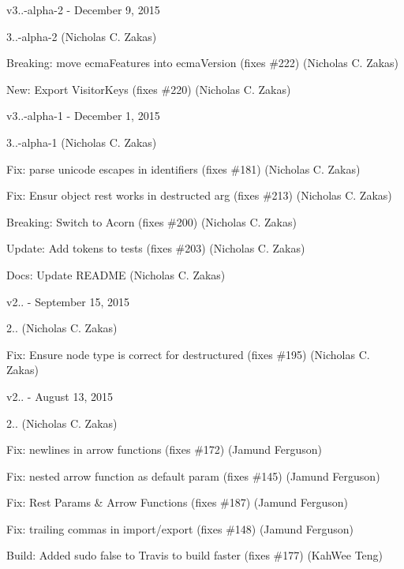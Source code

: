 v3..-\/alpha-\/2 -\/ December 9, 2015


\begin{DoxyItemize}
\item 3..-\/alpha-\/2 (Nicholas C. Zakas)
\item Breaking\+: move ecma\+Features into ecma\+Version (fixes \#222) (Nicholas C. Zakas)
\item New\+: Export Visitor\+Keys (fixes \#220) (Nicholas C. Zakas)
\end{DoxyItemize}

v3..-\/alpha-\/1 -\/ December 1, 2015


\begin{DoxyItemize}
\item 3..-\/alpha-\/1 (Nicholas C. Zakas)
\item Fix\+: parse unicode escapes in identifiers (fixes \#181) (Nicholas C. Zakas)
\item Fix\+: Ensur object rest works in destructed arg (fixes \#213) (Nicholas C. Zakas)
\item Breaking\+: Switch to Acorn (fixes \#200) (Nicholas C. Zakas)
\item Update\+: Add tokens to tests (fixes \#203) (Nicholas C. Zakas)
\item Docs\+: Update R\+E\+A\+D\+ME (Nicholas C. Zakas)
\end{DoxyItemize}

v2.. -\/ September 15, 2015


\begin{DoxyItemize}
\item 2.. (Nicholas C. Zakas)
\item Fix\+: Ensure node type is correct for destructured (fixes \#195) (Nicholas C. Zakas)
\end{DoxyItemize}

v2.. -\/ August 13, 2015


\begin{DoxyItemize}
\item 2.. (Nicholas C. Zakas)
\item Fix\+: newlines in arrow functions (fixes \#172) (Jamund Ferguson)
\item Fix\+: nested arrow function as default param (fixes \#145) (Jamund Ferguson)
\item Fix\+: Rest Params \& Arrow Functions (fixes \#187) (Jamund Ferguson)
\item Fix\+: trailing commas in import/export (fixes \#148) (Jamund Ferguson)
\item Build\+: Added sudo false to Travis to build faster (fixes \#177) (Kah\+Wee Teng)
\end{DoxyItemize}

